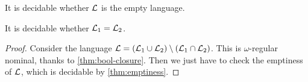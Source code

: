 \begin{theorem}
It is decidable whether $\mathcal{L}$ is the empty language.
\label{thm:emptiness}
\end{theorem}

\begin{theorem}
It is decidable whether $\mathcal{L}_1 = \mathcal{L}_2$.
\end{theorem}

\begin{proof}
Consider the language $\mathcal{L} = (\mathcal{L}_1 \cup \mathcal{L}_2) \setminus (\mathcal{L}_1 \cap \mathcal{L}_2 )$. This is $\omega$-regular nominal, thanks to \cref{thm:bool-closure}. Then we just have to check the emptiness of $\mathcal{L}$, which is decidable by \cref{thm:emptiness}.
\end{proof}
